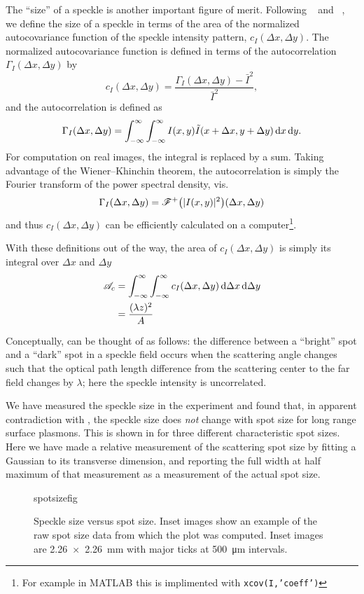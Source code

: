 The ``size'' of a speckle is another important figure of merit.
Following ~\cite{goodman1975statistical} and
~\cite{dainty1975laser}, we define the size of a
speckle in terms of the area of the normalized
autocovariance function of the speckle intensity pattern, $c_I(\Delta x,
\Delta y)$.  The normalized autocovariance function is defined in terms of
the autocorrelation $\Gamma_I(\Delta x, \Delta y)$ by 
\begin{equation}
c_I(\Delta x, \Delta y) = \frac{\Gamma_I(\Delta x, \Delta y) - \bar{I}^2}{\bar{I}^2},
\end{equation}
and the autocorrelation is defined as
\begin{equation}
\Gamma_I(\Delta x, \Delta y) = \int_{-\infty}^{\infty}\int_{-\infty}^{\infty} I(x,y) \tilde{I}(x+\Delta x,y+\Delta y) \,\mathrm{d} x \,\mathrm{d} y.
\end{equation}
For computation on real images, the integral is replaced by a sum.  Taking
advantage of the Wiener–Khinchin theorem, the autocorrelation is simply the
Fourier transform of the power spectral density, vis.
\begin{equation}
\Gamma_I(\Delta x, \Delta y) = {\mathscr{F}^{+}\bigl(|I(x,y)|^2\bigr)}(\Delta x, \Delta y)
\end{equation}
and thus  $c_I(\Delta x, \Delta y)$ can be efficiently calculated on a
computer\footnote{For example in MATLAB this is implimented with
\texttt{xcov(I,'coeff')}}.

With these definitions out of the way, the area of $c_I(\Delta x, \Delta
y)$ is simply its integral over $\Delta x$ and $\Delta y$
\begin{align}
\mathscr{A}_c &= \int_{-\infty}^{\infty}\int_{-\infty}^{\infty} c_I(\Delta x, \Delta y) \,\mathrm{d} \Delta x \,\mathrm{d} \Delta y\\
&=\frac{(\lambda z)^2}{A}
\label{eqn:spotsize}
\end{align}

Conceptually,  can be thought of as follows: the
difference between a ``bright'' spot and a ``dark'' spot in a speckle field
occurs when the scattering angle changes such that the optical path length
difference from the scattering center to the far field changes by
$\lambda$; here the speckle intensity is uncorrelated.

We have measured the speckle size in the experiment and found that, in
apparent contradiction with , the speckle size does
\textit{not} change with spot size for long range surface plasmons.  This
is shown in  for three different characteristic spot
sizes.  Here we have made a relative measurement of the scattering spot
size by fitting a Gaussian to its transverse dimension, and reporting the
full width at half maximum of that measurement as a measurement of the
actual spot size.
\begin{figure}[ht]
 \centering
 {spotsizefig}
 \caption{Speckle size versus spot size.  Inset images show an example of
 the raw spot size data from which the plot was computed.  Inset images are
 \SI{2.26x2.26}{\milli\meter} with major ticks at
 \SI{500}{\micro\meter} intervals.}
 \label{fig:spotsize}
\end{figure}


